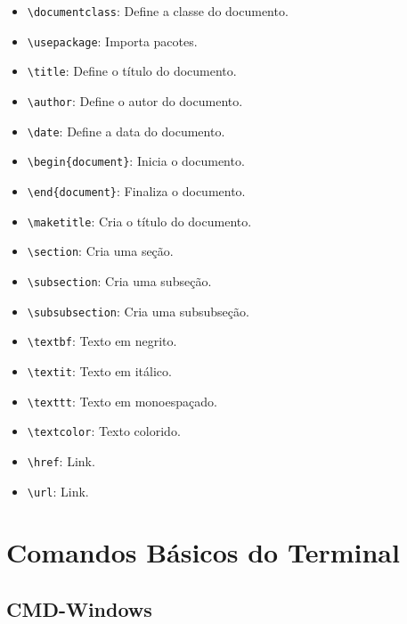 \documentclass[a4paper, 12pt]{article}
\begin{document}
\begin{itemize}
    \item \texttt{\textbackslash documentclass}: Define a classe do documento.
    \item \texttt{\textbackslash usepackage}: Importa pacotes.
    \item \texttt{\textbackslash title}: Define o título do documento.
    \item \texttt{\textbackslash author}: Define o autor do documento.
    \item \texttt{\textbackslash date}: Define a data do documento.
    \item \texttt{\textbackslash begin\{document\}}: Inicia o documento.
    \item \texttt{\textbackslash end\{document\}}: Finaliza o documento.
    \item \texttt{\textbackslash maketitle}: Cria o título do documento.
    \item \texttt{\textbackslash section}: Cria uma seção.
    \item \texttt{\textbackslash subsection}: Cria uma subseção.
    \item \texttt{\textbackslash subsubsection}: Cria uma subsubseção.
    \item \texttt{\textbackslash textbf}: Texto em negrito.
    \item \texttt{\textbackslash textit}: Texto em itálico.
    \item \texttt{\textbackslash texttt}: Texto em monoespaçado.
    \item \texttt{\textbackslash textcolor}: Texto colorido.
    \item \texttt{\textbackslash href}: Link.
    \item \texttt{\textbackslash url}: Link.
\end{itemize}


\section{Comandos Básicos do Terminal}\label{comandos-basicos-do-terminal}

\subsection{CMD-Windows}\label{cmd-windows}
\end{document}
